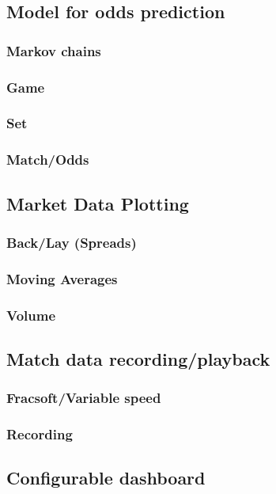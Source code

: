 \documentclass[10pt]{report}
\begin{document}
\subsection {Model for odds prediction}
\subsubsection {Markov chains}
\subsubsection {Game}
\subsubsection {Set}
\subsubsection {Match/Odds}


\subsection {Market Data Plotting}
\subsubsection {Back/Lay (Spreads)}
\subsubsection {Moving Averages}
\subsubsection {Volume}

\subsection {Match data recording/playback}
\subsubsection {Fracsoft/Variable speed}
\subsubsection {Recording}

\subsection {Configurable dashboard}
\end{document}
